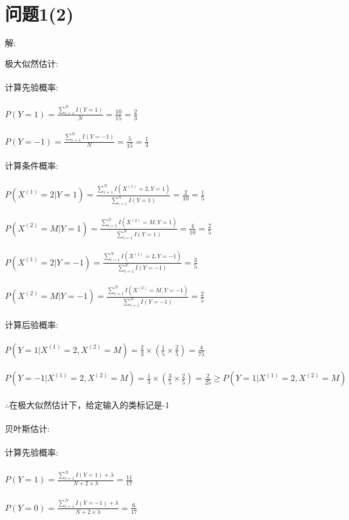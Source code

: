 \documentclass[]{article}
\begin{document}
\section{问题1(2)}
\begin{flushleft}
	解:
\end{flushleft}
极大似然估计:\\\\
计算先验概率:\\\\
$P(Y=1)=\frac{\sum_{i=1}^{N}I(Y=1)}{N}=\frac{10}{15}=\frac{2}{3}$\\\\
$P(Y=-1)=\frac{\sum_{i=1}^{N}I(Y=-1)}{N}=\frac{5}{15}=\frac{1}{3}$\\\\
计算条件概率:\\\\
$P(X^{(1)}=2|Y=1)=\frac{\sum_{i=1}^{N}I(X^{(1)}=2,Y=1)}{\sum_{i=1}^{N}I(Y=1)}=\frac{2}{10}=\frac{1}{5}$\\\\
$P(X^{(2)}=M|Y=1)=\frac{\sum_{i=1}^{N}I(X^{(2)}=M,Y=1)}{\sum_{i=1}^{N}I(Y=1)}=\frac{4}{10}=\frac{2}{5}$\\\\
$P(X^{(1)}=2|Y=-1)=\frac{\sum_{i=1}^{N}I(X^{(1)}=2,Y=-1)}{\sum_{i=1}^{N}I(Y=-1)}=\frac{3}{5}$\\\\
$P(X^{(2)}=M|Y=-1)=\frac{\sum_{i=1}^{N}I(X^{(2)}=M,Y=-1)}{\sum_{i=1}^{N}I(Y=-1)}=\frac{2}{5}$\\\\
计算后验概率:\\\\
$P(Y=1|X^{(1)}=2,X^{(2)}=M)=\frac{2}{3}\times(\frac{1}{5}\times\frac{2}{5})=\frac{4}{75}$\\\\
$P(Y=-1|X^{(1)}=2,X^{(2)}=M)=\frac{1}{3}\times(\frac{3}{5}\times\frac{2}{5})=\frac{2}{25}\geq P(Y=1|X^{(1)}=2,X^{(2)}=M)$\\\\
$\therefore$在极大似然估计下，给定输入的类标记是-1\\\\
贝叶斯估计:\\\\
计算先验概率:\\\\
$P(Y=1)=\frac{\sum_{i=1}^{N}I(Y=1)+\lambda}{N+2\times \lambda}=\frac{11}{17}$\\\\
$P(Y=0)=\frac{\sum_{i=1}^{N}I(Y=-1)+\lambda}{N+2\times \lambda}=\frac{6}{17}$\\\\
\end{document}
